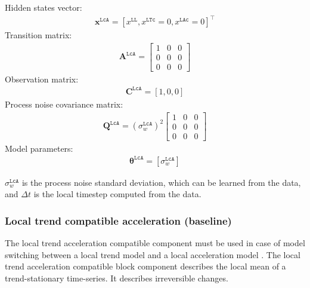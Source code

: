 Hidden states vector:
\begin{gather*}
 \mathbf{x}^{\mathtt{LcA}} = [x^{\mathtt{LL}}, x^{\mathtt{LTc}}=0, x^{\mathtt{LAc}}=0]^{\intercal}
 \end{gather*}
Transition matrix: 
\begin{gather*}
\mathbf{A}^{\mathtt{LcA}}= \left[\begin{array}{ccc}1&0&0\\0&0&0\\0&0&0\end{array}\right]
\end{gather*}
Observation matrix: 
\begin{gather*}
\mathbf{C}^{\mathtt{LcA}}=[1, 0, 0]
\end{gather*}
Process noise covariance matrix: 
\begin{gather*}
\mathbf{Q}^{\mathtt{LcA}}=(\sigma_{w}^{\mathtt{LcA}})^{2}\left[\begin{array}{ccc}1&0&0\\0&0&0\\0&0&0\end{array}\right]
\end{gather*}
Model parameters: 
\begin{gather*}
\bm\theta^{\mathtt{LcA}}=[\sigma_{w}^{\mathtt{LcA}} ]
\end{gather*}

\noindent
$\sigma_{w}^{\mathtt{LcA}}$ is the process noise standard deviation, which can be learned from the data, and $\Delta t$ is the local timestep computed from the data.

\subsubsection{Local trend compatible acceleration (baseline)}
The local trend acceleration compatible component must be used in case of model switching between a local trend model and a local acceleration model \cite{Nguyen2018}.
The local trend acceleration compatible block component describes the local mean of a trend-stationary time-series. 
It describes irreversible changes.\\

